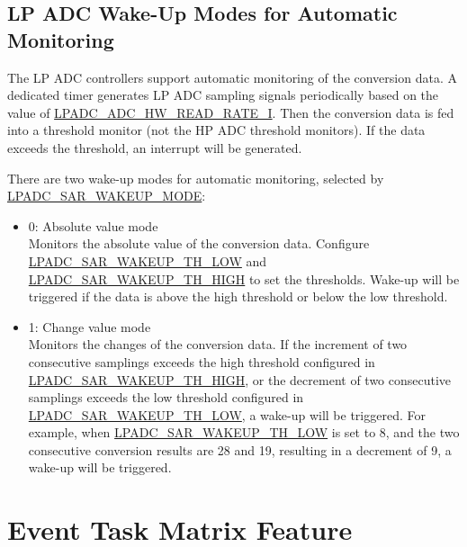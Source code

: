 \documentclass[main\_\_EN.tex]{subfiles}
\begin{document}
\subsection{LP ADC Wake-Up Modes for Automatic Monitoring}

The LP ADC controllers support automatic monitoring of the conversion data. A dedicated timer generates LP ADC sampling signals periodically based on the value of \hyperref[fielddesc:LPADCADC1HWREADENI]{LPADC\_ADC\_HW\_READ\_RATE\_I}. Then the conversion data is fed into a threshold monitor (not the HP ADC threshold monitors). If the data exceeds the threshold, an interrupt will be generated.

There are two wake-up modes for automatic monitoring, selected by \hyperref[fielddesc:LPADCSAR1WAKEUPMODE]{LPADC\_SAR\_WAKEUP\_MODE}:

   \begin{itemize}
       \item 0: Absolute value mode \\
        Monitors the absolute value of the conversion data. Configure \hyperref[fielddesc:LPADCSAR1WAKEUPTHLOW]{LPADC\_SAR\_WAKEUP\_TH\_LOW} and \hyperref[fielddesc:LPADCSAR1WAKEUPTHHIGH]{LPADC\_SAR\_WAKEUP\_TH\_HIGH} to set the thresholds. Wake-up will be triggered if the data is above the high threshold or below the low threshold.

       \item 1: Change value mode \\
        Monitors the changes of the conversion data. If the increment of two consecutive samplings exceeds the high threshold configured in \hyperref[fielddesc:LPADCSAR1WAKEUPTHHIGH]{LPADC\_SAR\_WAKEUP\_TH\_HIGH}, or the decrement of two consecutive samplings exceeds the low threshold configured in \hyperref[fielddesc:LPADCSAR1WAKEUPTHLOW]{LPADC\_SAR\_WAKEUP\_TH\_LOW}, a wake-up will be triggered. For example, when \hyperref[fielddesc:LPADCSAR1WAKEUPTHLOW]{LPADC\_SAR\_WAKEUP\_TH\_LOW} is set to 8, and the two consecutive conversion results are 28 and 19, resulting in a decrement of 9, a wake-up will be triggered.

    \end{itemize}



\section{Event Task Matrix Feature}
\label{sec:adc-etm-func}
\end{document}
